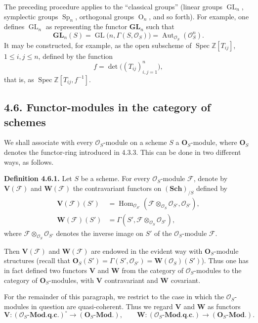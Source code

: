 The preceding procedure applies to the ``classical groups'' (linear
groups \(\operatorname{GL}_n\), symplectic groups
\(\operatorname{Sp}_n\), orthogonal groups \(\operatorname O_n\), and
so forth). For example, one defines \(\operatorname{GL}_n\) as
representing the functor \(\mathbf{GL}_n\) such that
\[
  \mathbf{GL}_n(S)
    =\operatorname{GL}\bigl(n,\Gamma(S,\mathcal O_S)\bigr)
    =\operatorname{Aut}_{\mathcal O_S}(\mathcal O_S^n).
\]
It may be constructed, for example, as the open subscheme of
\(\operatorname{Spec}\mathbb Z[T_{ij}]\), \(1\leq i,j\leq n\), defined
by the function
\[
  f=\det\bigl((T_{ij})_{i,j=1}^n\bigr),
\]
that is, as \(\operatorname{Spec}\mathbb Z[T_{ij},f^{-1}]\).

\subsection*{4.6. Functor-modules in the category of schemes}

We shall associate with every \(\mathcal O_S\)-module on a scheme \(S\)
a \(\mathbf O_S\)-module, where \(\mathbf O_S\) denotes the functor-ring
introduced in 4.3.3. This can be done in two different ways, as follows.

\medskip
\noindent\textbf{Definition 4.6.1.}
Let \(S\) be a scheme. For every \(\mathcal O_S\)-module \(\mathscr F\),
denote by \(\mathbf V(\mathscr F)\) and \(\mathbf W(\mathscr F)\) the
contravariant functors on \((\mathbf{Sch})_{/S}\) defined by
\begin{align*}
  \mathbf V(\mathscr F)(S')
    &=\operatorname{Hom}_{\mathcal O_{S'}}
       (\mathscr F\otimes_{\mathcal O_S}\mathcal O_{S'},
        \mathcal O_{S'}),\\
  \mathbf W(\mathscr F)(S')
    &=\Gamma(S',\mathscr F\otimes_{\mathcal O_S}\mathcal O_{S'}),
\end{align*}
where \(\mathscr F\otimes_{\mathcal O_S}\mathcal O_{S'}\) denotes the
inverse image on \(S'\) of the \(\mathcal O_S\)-module \(\mathscr F\).

Then \(\mathbf V(\mathscr F)\) and \(\mathbf W(\mathscr F)\) are
endowed in the evident way with \(\mathbf O_S\)-module structures
(recall that
\(\mathbf O_S(S')=\Gamma(S',\mathcal O_{S'})
=\mathbf W(\mathcal O_S)(S')\)). Thus one has in fact defined two
functors \(\mathbf V\) and \(\mathbf W\) from the category of
\(\mathcal O_S\)-modules to the category of \(\mathbf O_S\)-modules,
with \(\mathbf V\) contravariant and \(\mathbf W\) covariant.

For the remainder of this paragraph, we restrict to the case in which
the \(\mathcal O_S\)-modules in question are quasi-coherent. Thus we
regard \(\mathbf V\) and \(\mathbf W\) as functors
\[
  \mathbf V:(\mathcal O_S\text{-}\mathbf{Mod.q.c.})^{\circ}
    \longrightarrow(\mathbf O_S\text{-}\mathbf{Mod.}),
  \qquad
  \mathbf W:(\mathcal O_S\text{-}\mathbf{Mod.q.c.})
    \longrightarrow(\mathbf O_S\text{-}\mathbf{Mod.}).
\]

